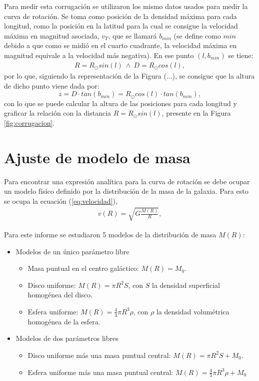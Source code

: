 \documentclass[letterpaper,oneside]{article}
\begin{document}
Para medir esta corrugación se utilizaron los mismo datos usados para medir la curva de rotación. Se toma como posición de la densidad máxima para cada longitud, como la posición en la latitud para la cual se consigue la velocidad máxima en magnitud asociada, $v_{T}$, que se llamará $b_{min}$ (se define como $min$ debido a que como se midió en el cuarto cuadrante, la velocidad máxima en magnitud equivale a la velocidad más negativa). En ese punto $(l,b_{min})$ se tiene:
\begin{gather*}
R=R_{\odot}sin(l) \ \land \ D=R_{\odot}cos(l),
\end{gather*}
por lo que, siguiendo la representación de la Figura (...), se consigue que la altura de dicho punto viene dada por:
\begin{equation*}
z=D\cdot tan(b_{min})=R_{\odot}cos(l)\cdot tan(b_{min}),
\end{equation*}
con lo que se puede calcular la altura de las posiciones para cada longitud y graficar la relación con la distancia $R=R_{\odot}sin(l)$, presente en la Figura \ref{fig:corrugacion}.
\section{Ajuste de modelo de masa}
Para encontrar una expresión analítica para la curva de rotación se debe ocupar un modelo físico definido por la distribución de la masa de la galaxia. Para esto se ocupa la ecuación (\ref{eq:velocidad}),
\begin{gather*}
v(R)=\sqrt{G\frac{M(R)}{R}},
\end{gather*}

Para este informe se estudiaron 5 modelos de la distribución de masa $M(R)$:
\begin{itemize}
\item Modelos de un único parámetro libre
\begin{itemize}
\item Masa puntual en el centro galáctico: $M(R)=M_0$.
\item Disco uniforme: $M(R)=\pi R^2S$, con $S$ la densidad superficial homogénea del disco.
\item Esfera uniforme: $M(R)=\frac{4}{3}\pi R^3 \rho$, con $\rho$ la densidad volumétrica homogénea de la esfera.
\end{itemize}
\item Modelos de dos parámetros libres
\begin{itemize}
\item Disco uniforme más una masa puntual central: $M(R)=\pi R^2S+M_0$.
\item Esfera uniforme más una masa puntual central: $M(R)=\frac{4}{3}\pi R^3 \rho+M_0$
\end{itemize}
\end{itemize}
\end{document}
